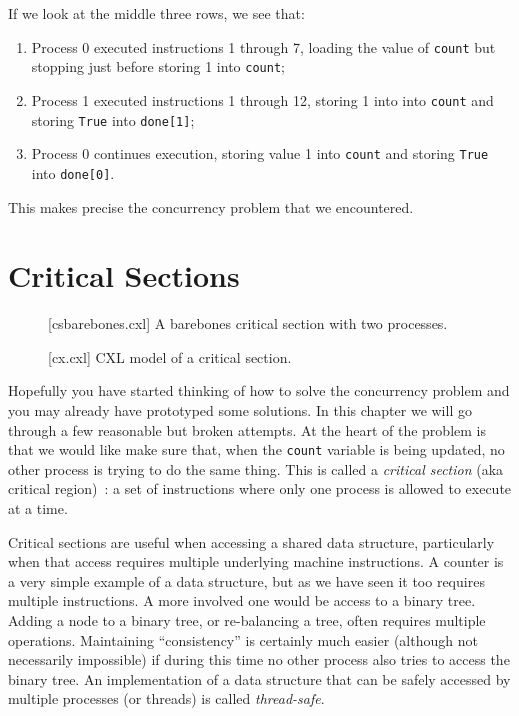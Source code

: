 \documentclass{report}
\newenvironment{code}{
\tcolorbox
}{
\endtcolorbox
}
\begin{document}
If we look at the middle three rows, we see that:
\begin{enumerate}
\item Process 0 executed instructions 1 through 7, loading the value of
\texttt{count} but stopping just before storing 1 into \texttt{count};
\item Process 1 executed instructions 1 through 12, storing 1 into
into \texttt{count} and storing \texttt{True} into \texttt{done[1]};
\item Process 0 continues execution, storing value 1 into \texttt{count}
and storing \texttt{True} into \texttt{done[0]}.
\end{enumerate}

This makes precise the concurrency problem that we encountered.

\chapter{Critical Sections}

\begin{figure}
\begin{code}
\end{code}
\caption{[csbarebones.cxl] A barebones critical section with two processes.}
\label{fig:csbarebones}
\end{figure}

\begin{figure}
\begin{code}
\end{code}
\caption{[cx.cxl] CXL model of a critical section.}
\label{fig:cs}
\end{figure}

Hopefully you have started thinking of how to solve the concurrency
problem and you may already have prototyped some solutions.
In this chapter we will go through a few reasonable but broken attempts.
At the heart of the problem is that we would like make sure that, when
the \texttt{count} variable is being updated, no other process is
trying to do the same thing.  This is called a \emph{critical section}
(aka critical region)~\cite{EWD123}: a
set of instructions where only one process is allowed to execute at a
time.

Critical sections are useful when accessing a shared data
structure, particularly when that access requires multiple underlying
machine instructions.  A counter is a very simple example of
a data structure, but as we have seen it too requires multiple instructions.
A more involved one would be access to a binary tree.
Adding a node to a binary tree, or re-balancing a tree, often requires
multiple operations.  Maintaining ``consistency'' is certainly much easier
(although not necessarily impossible) if during this time no other
process also tries to access the binary tree.
An implementation of a data structure that can be safely accessed by multiple
processes (or threads) is called \emph{thread-safe}.
\end{document}
